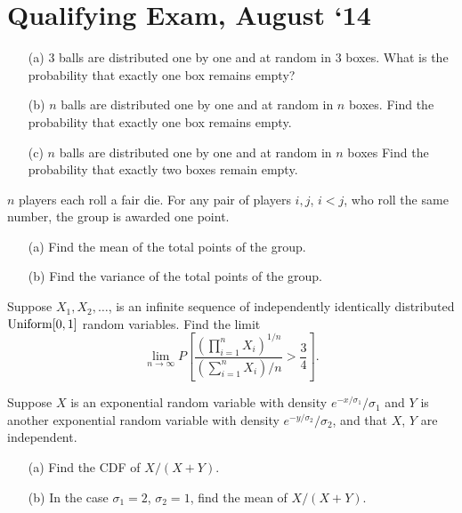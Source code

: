 \section{Qualifying Exam, August `14}
\begin{problem}
  \hfill
  \begin{itemize}[noitemsep]
  \item[(a)] \(3\) balls are distributed one by one and at random in \(3\)
    boxes. What is the probability that exactly one box remains empty?
  \item[(b)] \(n\) balls are distributed one by one and at random in \(n\)
    boxes. Find the probability that exactly one box remains empty.
  \item[(c)] \(n\) balls are distributed one by one and at random in \(n\)
    boxes Find the probability that exactly two boxes remain empty.
  \end{itemize}
\end{problem}
\begin{solution}
\end{solution}

\begin{problem}
  \(n\) players each roll a fair die. For any pair of players \(i,j\),
  \(i<j\), who roll the same number, the group is awarded one point.
  \begin{itemize}[noitemsep]
  \item[(a)] Find the mean of the total points of the group.
  \item[(b)] Find the variance of the total points of the group.
  \end{itemize}
\end{problem}
\begin{solution}
\end{solution}

\begin{problem}
  Suppose \(X_1,X_2,\dotsc\), is an infinite sequence of independently
  identically distributed \(\operatorname{Uniform}[0,1]\) random variables. Find the
  limit
  \[
    \lim_{n\to\infty} P%
    \left[%
      \frac{\left(\prod_{i=1}^n X_i\right)^{1/n}}
      {\left(\sum_{i=1}^nX_i\right)/n}>\frac{3}{4}%
    \right].
  \]
\end{problem}
\begin{solution}
\end{solution}

\begin{problem}
  Suppose \(X\) is an exponential random variable with density
  \(e^{-x/\sigma_1}/\sigma_1\) and \(Y\) is another exponential random
  variable with density \(e^{-y/\sigma_2}/\sigma_2\), and that \(X\), \(Y\)
  are independent.
  \begin{itemize}[noitemsep]
  \item[(a)] Find the CDF of \(X/(X+Y)\).
  \item[(b)] In the case \(\sigma_1=2\), \(\sigma_2=1\), find the mean of
    \(X/(X+Y)\).
  \end{itemize}
\end{problem}
\begin{solution}
\end{solution}

